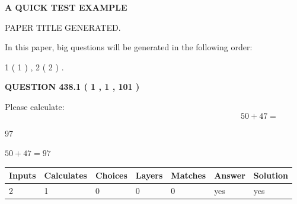 \documentclass[12pt]{article}
\begin{document}
   
   
   
   
   
 \vspace{0.2in}
{\LARGE {\textbf{ A QUICK TEST EXAMPLE}}}
   
   
 PAPER TITLE GENERATED.
   
   
   
\vspace{0.2in}
   
In this paper, big questions will be generated in the following order: 
   
   
   1 ( 1 )
 ,
   2 ( 2 )
 .
  
\vspace{0.2in}
  
{\textbf{\Large{QUESTION
438.1 
 ( 1 , 1 , 101 )
}}}
  
  
 
Please calculate:
\begin{equation}
50 +  %
47 = \nonumber
\end{equation}
 
 
 
\noindent{}
 
 

97
 
 
\noindent{}
 
 

 
 
 
\noindent{}
 
 

$ %
50 +  %
47=   %
97$
 
 
\noindent{}
 
 

 
   
   
   
   
\noindent\begin{tabular}{|l|l|l|l|l|l|l|}
 \hline
Inputs & Calculates & Choices & Layers & Matches & Answer & Solution \\ \hline
 2  & 
 1  & 
 0
  & 
 0  & 
 0  & 
  yes & 
  yes 
  \\ \hline
 \end{tabular}
   
   
   
\end{document}

